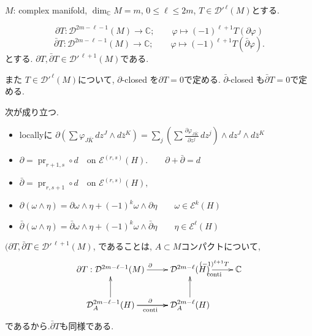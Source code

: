 \begin{tcolorbox}[mybox]
\begin{defn}
\label{defn-M-4.13}
 \(M\): complex manifold, \(\dim_{\mathbb{C}}M=m\),  $0\leq \ell\leq 2m$, 
\(T\in \mathcal{D}'^{\,\ell}(M)\)とする. 

\[
\partial T:\mathcal{D}^{2m-\ell-1}(M)\to \mathbb{C};\qquad \varphi\mapsto (-1)^{\ell+1}T(\partial\varphi)
\]
\[
\bar{\partial}T:\mathcal{D}^{2m-\ell-1}(M)\to \mathbb{C};\qquad \varphi\mapsto (-1)^{\ell+1}T(\bar{\partial}\varphi).
\]
とする. 
 \(\partial T,\bar{\partial}T\in \mathcal{D}'^{\,\ell+1}(M)\)である.

また
\(T\in \mathcal{D}'^{\,\ell}(M)\)について, 
\(\partial \)-closed を$\partial T=0$で定める. 
\(\bar{\partial} \)-closed も$\bar{\partial} T=0$で定める. 

\end{defn}
\end{tcolorbox}

次が成り立つ. 
\begin{itemize}
\item locallyに
\(
\partial\left(\sum \varphi_{J\bar{K}}\,dz^{J}\wedge d\bar{z}^{K}\right)
=
\sum_{j}\left(\sum \frac{\partial \varphi_{J\bar{K}}}{\partial z^{j}}\,dz^{j}\right)\wedge dz^{J}\wedge d\bar{z}^{K}
\)
\item \(
\partial=\operatorname{pr}_{r+1,s}\circ d \quad \text{on } \mathcal{E}^{(r,s)}(H).
\qquad
\partial+\bar{\partial}=d
\)
\item 
\(
\bar{\partial}=\operatorname{pr}_{r,s+1}\circ d \quad \text{on } \mathcal{E}^{(r,s)}(H),
\)
\item
\(
\partial(\omega\wedge \eta)=\partial\omega\wedge \eta+(-1)^{k}\omega\wedge \partial\eta
\qquad
\omega\in \mathcal{E}^{k}(H)
\)
\item
\(
\bar{\partial}(\omega\wedge \eta)=\bar{\partial}\omega\wedge \eta+(-1)^{k}\omega\wedge \bar{\partial}\eta
\qquad
\eta\in \mathcal{E}^{\ell}(H)
\)
\end{itemize}

\(
(\partial T,\bar{\partial}T\in \mathcal{D}'^{\,\ell+1}(M)
\), であることは, $A\subset M$コンパクトについて, 
\[
\xymatrix{
\partial T: \mathcal{D}^{2m-\ell-1}(M) \ar[r]^{\partial} &
\mathcal{D}^{2m-\ell}(H) \ar[r]^{(-1)^{\ell+1}T}_{\text{conti}} &
\mathbb{C} \\
\mathcal{D}^{2m-\ell-1}_{A}(H) \ar[r]^{\partial} \ar[u] \ar[r]_{\text{conti}} &
\mathcal{D}^{2m-\ell}_{A}(H) \ar[u]
}
\]
であるから.\(\bar{\partial}T\)も同様である. 

